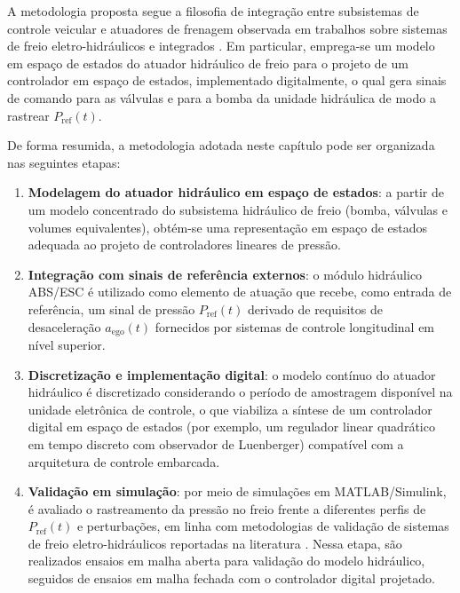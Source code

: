 A metodologia proposta segue a filosofia de integração entre subsistemas de controle veicular e atuadores de frenagem observada em trabalhos sobre sistemas de freio eletro-hidráulicos e integrados \cite{HouhuaJing2022,PressureCoordinatedControl2023,MotorParametricDesign2023}. Em particular, emprega-se um modelo em espaço de estados do atuador hidráulico de freio para o projeto de um controlador em espaço de estados, implementado digitalmente, o qual gera sinais de comando para as válvulas e para a bomba da unidade hidráulica de modo a rastrear $P_{\mathrm{ref}}(t)$.

De forma resumida, a metodologia adotada neste capítulo pode ser organizada nas seguintes etapas:

\begin{enumerate}
    \item \textbf{Modelagem do atuador hidráulico em espaço de estados}: a partir de um modelo concentrado do subsistema hidráulico de freio (bomba, válvulas e volumes equivalentes), obtém-se uma representação em espaço de estados adequada ao projeto de controladores lineares de pressão.

    \item \textbf{Integração com sinais de referência externos}: o módulo hidráulico ABS/ESC é utilizado como elemento de atuação que recebe, como entrada de referência, um sinal de pressão $P_{\mathrm{ref}}(t)$ derivado de requisitos de desaceleração $a_{\mathrm{ego}}(t)$ fornecidos por sistemas de controle longitudinal em nível superior.

    \item \textbf{Discretização e implementação digital}: o modelo contínuo do atuador hidráulico é discretizado considerando o período de amostragem disponível na unidade eletrônica de controle, o que viabiliza a síntese de um controlador digital em espaço de estados (por exemplo, um regulador linear quadrático em tempo discreto com observador de Luenberger) compatível com a arquitetura de controle embarcada.

    \item \textbf{Validação em simulação}: por meio de simulações em MATLAB/Simulink, é avaliado o rastreamento da pressão no freio frente a diferentes perfis de $P_{\mathrm{ref}}(t)$ e perturbações, em linha com metodologias de validação de sistemas de freio eletro-hidráulicos reportadas na literatura \cite{ZengYangHuang2023,MotorParametricDesign2023}. Nessa etapa, são realizados ensaios em malha aberta para validação do modelo hidráulico, seguidos de ensaios em malha fechada com o controlador digital projetado.
\end{enumerate}

